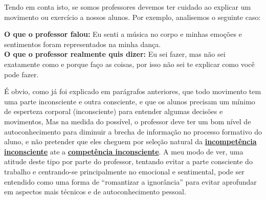 Tendo em conta isto, se somos professores devemos ter cuidado ao explicar 
um movimento ou exercício a nossos alunos. 
Por exemplo, analisemos o seguinte caso:
\begin{citando}%
\textbf{O que o professor falou:} Eu senti a música no corpo e 
minhas emoções e sentimentos foram representados na minha dança.\\
\textbf{O que o professor realmente quis dizer:} Eu sei fazer, 
mas não sei exatamente como e porque faço as coisas, 
por isso não sei te explicar como você pode fazer.
\end{citando}
É obvio, como já foi explicado em parágrafos anteriores,
que todo movimento tem uma parte inconsciente e outra consciente,
e que os alunos precisam um mínimo de esperteza corporal (inconsciente) 
para entender algumas decisões e movimentos,
Mas na medida do possível, o professor deve ter um bom nível de autoconhecimento 
para diminuir a brecha de informação no processo formativo do aluno,
e não pretender que eles cheguem por seleção natural da 
\hyperref[ref:IncompetenciaInconsciente]{\textbf{incompetência inconsciente}}
ate a \hyperref[ref:CompetenciaInconsciente]{\textbf{competência inconsciente}}.
A meu modo de ver, uma atitude deste tipo por parte do professor, tentando evitar a parte consciente do trabalho 
e centrando-se principalmente no emocional e sentimental,   
pode ser entendido como uma forma de ``romantizar a ignorância'' 
para evitar aprofundar em aspectos mais técnicos
e de autoconhecimento pessoal.


